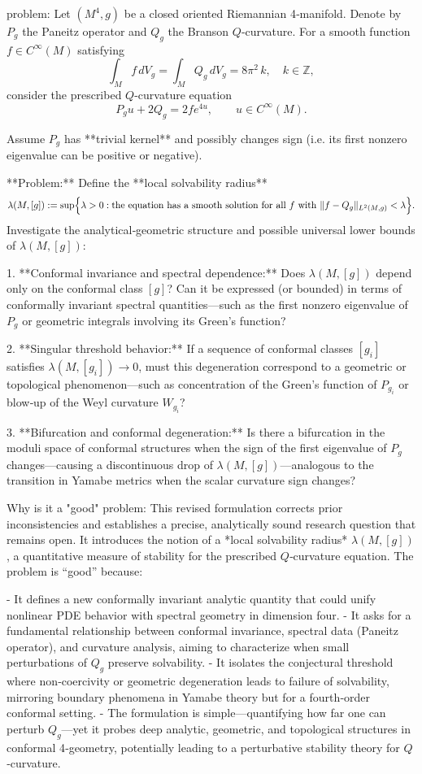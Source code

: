 problem:  
Let \((M^4,g)\) be a closed oriented Riemannian 4‑manifold.  
Denote by \(P_g\) the Paneitz operator and \(Q_g\) the Branson \(Q\)‑curvature. For a smooth function \(f\in C^\infty(M)\) satisfying  
\[
\int_M f\, dV_g = \int_M Q_g \, dV_g = 8\pi^2\,k,\quad k\in\mathbb{Z},
\]  
consider the prescribed \(Q\)-curvature equation  
\[
P_g u + 2 Q_g = 2 f e^{4u},\qquad u\in C^\infty(M).
\]

Assume \(P_g\) has **trivial kernel** and possibly changes sign (i.e. its first nonzero eigenvalue can be positive or negative).

**Problem:**  
Define the **local solvability radius**
\[
\lambda(M,[g]) := \sup\Bigl\{\lambda>0 : \text{the equation has a smooth solution for all } f \text{ with } \|f-Q_g\|_{L^2(M,g)} < \lambda\Bigr\}.
\]
Investigate the analytical‑geometric structure and possible universal lower bounds of \(\lambda(M,[g])\):

1. **Conformal invariance and spectral dependence:**  
   Does \(\lambda(M,[g])\) depend only on the conformal class \([g]\)? Can it be expressed (or bounded) in terms of conformally invariant spectral quantities—such as the first nonzero eigenvalue of \(P_g\) or geometric integrals involving its Green’s function?

2. **Singular threshold behavior:**  
   If a sequence of conformal classes \([g_i]\) satisfies \(\lambda(M,[g_i]) \to 0\), must this degeneration correspond to a geometric or topological phenomenon—such as concentration of the Green’s function of \(P_{g_i}\) or blow‑up of the Weyl curvature \(W_{g_i}\)?  

3. **Bifurcation and conformal degeneration:**  
   Is there a bifurcation in the moduli space of conformal structures when the sign of the first eigenvalue of \(P_g\) changes—causing a discontinuous drop of \(\lambda(M,[g])\)—analogous to the transition in Yamabe metrics when the scalar curvature sign changes?  

Why is it a "good" problem:  
This revised formulation corrects prior inconsistencies and establishes a precise, analytically sound research question that remains open. It introduces the notion of a *local solvability radius* \(\lambda(M,[g])\), a quantitative measure of stability for the prescribed \(Q\)‑curvature equation. The problem is “good” because:

- It defines a new conformally invariant analytic quantity that could unify nonlinear PDE behavior with spectral geometry in dimension four.  
- It asks for a fundamental relationship between conformal invariance, spectral data (Paneitz operator), and curvature analysis, aiming to characterize when small perturbations of \(Q_g\) preserve solvability.  
- It isolates the conjectural threshold where non‑coercivity or geometric degeneration leads to failure of solvability, mirroring boundary phenomena in Yamabe theory but for a fourth‑order conformal setting.  
- The formulation is simple—quantifying how far one can perturb \(Q_g\)—yet it probes deep analytic, geometric, and topological structures in conformal 4‑geometry, potentially leading to a perturbative stability theory for \(Q\)‑curvature.